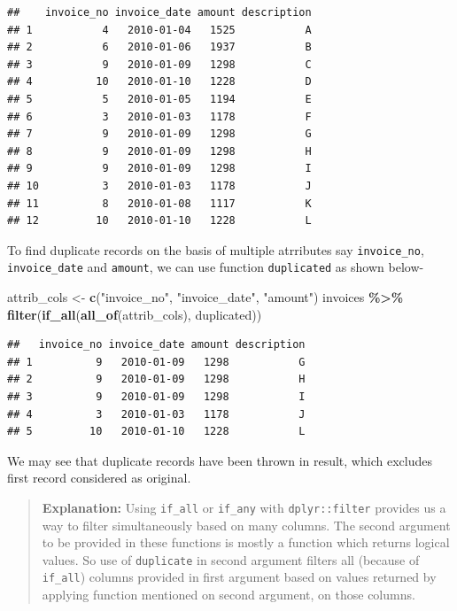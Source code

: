 \documentclass[
]{book}
\newenvironment{Shaded}{\begin{snugshade}}{\end{snugshade}}
\newcommand{\FunctionTok}[1]{\textcolor[rgb]{0.13,0.29,0.53}{\textbf{#1}}}
\newcommand{\NormalTok}[1]{#1}
\newcommand{\OtherTok}[1]{\textcolor[rgb]{0.56,0.35,0.01}{#1}}
\newcommand{\SpecialCharTok}[1]{\textcolor[rgb]{0.81,0.36,0.00}{\textbf{#1}}}
\newcommand{\StringTok}[1]{\textcolor[rgb]{0.31,0.60,0.02}{#1}}
\begin{document}
\begin{verbatim}
##    invoice_no invoice_date amount description
## 1           4   2010-01-04   1525           A
## 2           6   2010-01-06   1937           B
## 3           9   2010-01-09   1298           C
## 4          10   2010-01-10   1228           D
## 5           5   2010-01-05   1194           E
## 6           3   2010-01-03   1178           F
## 7           9   2010-01-09   1298           G
## 8           9   2010-01-09   1298           H
## 9           9   2010-01-09   1298           I
## 10          3   2010-01-03   1178           J
## 11          8   2010-01-08   1117           K
## 12         10   2010-01-10   1228           L
\end{verbatim}

To find duplicate records on the basis of multiple atrributes say \texttt{invoice\_no}, \texttt{invoice\_date} and \texttt{amount}, we can use function \texttt{duplicated} as shown below-

\begin{Shaded}
\begin{Highlighting}[]
\NormalTok{attrib\_cols }\OtherTok{\textless{}{-}} \FunctionTok{c}\NormalTok{(}\StringTok{"invoice\_no"}\NormalTok{, }\StringTok{"invoice\_date"}\NormalTok{, }\StringTok{"amount"}\NormalTok{)}
\NormalTok{invoices }\SpecialCharTok{\%\textgreater{}\%} 
  \FunctionTok{filter}\NormalTok{(}\FunctionTok{if\_all}\NormalTok{(}\FunctionTok{all\_of}\NormalTok{(attrib\_cols), duplicated))}
\end{Highlighting}
\end{Shaded}

\begin{verbatim}
##   invoice_no invoice_date amount description
## 1          9   2010-01-09   1298           G
## 2          9   2010-01-09   1298           H
## 3          9   2010-01-09   1298           I
## 4          3   2010-01-03   1178           J
## 5         10   2010-01-10   1228           L
\end{verbatim}

We may see that duplicate records have been thrown in result, which excludes first record considered as original.

\begin{quote}
\textbf{Explanation:} Using \texttt{if\_all} or \texttt{if\_any} with \texttt{dplyr::filter} provides us a way to filter simultaneously based on many columns. The second argument to be provided in these functions is mostly a function which returns logical values. So use of \texttt{duplicate} in second argument filters all (because of \texttt{if\_all}) columns provided in first argument based on values returned by applying function mentioned on second argument, on those columns.
\end{quote}
\end{document}
